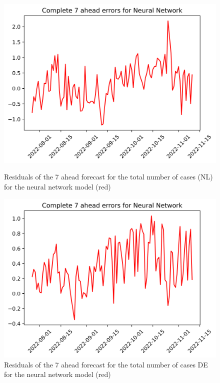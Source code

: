 \begin{figure}

\begin{minipage}{.45\textwidth}
  \centering
  \includegraphics[width=\linewidth]{pics/7_ah/7_ahead_errors_Neural Network.png}
  \caption{Residuals of the 7 ahead forecast for the total number of cases (NL) for the neural network model (red)}
  \label{fig:tot_cases_error_7_nn}
\end{minipage}
\begin{minipage}{.45\textwidth}
  \centering
  \includegraphics[width=\linewidth]{pics/7_ah/DE_7_ahead_errors_Neural Network.png}
  \caption{Residuals of the 7 ahead forecast for the total number of cases DE for the neural network model (red)}
  \label{fig:tot_cases_error_7_nn_DE}
\end{minipage}

\end{figure}
